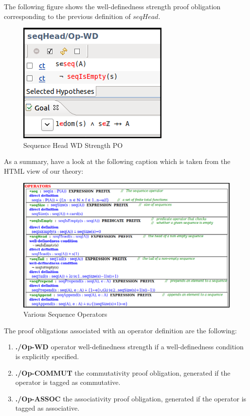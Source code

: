 The following figure shows the well-definedness strength proof obligation corresponding to the previous definition of $seqHead$.

\begin{center}
\begin{figure}
\label{seqOP}
\includegraphics{images/SeqHeadPO.png}
\caption{Sequence Head WD Strength PO}
\end{figure}
\end{center}

\par 
As a summary, have a look at the following caption which is taken from the HTML view of our theory:

\begin{center}
\begin{figure}
\label{seqOP}
\includegraphics{images/SeqOperators.png}
\caption{Various Sequence Operators}
\end{figure}
\end{center}

The proof obligations associated with an operator definition are the following:
\begin{enumerate}
	\item \textbf{./Op-WD} operator well-definedness strength if a well-definedness condition is explicitly specified.
	\item \textbf{./Op-COMMUT} the commutativity proof obligation, generated if the operator is tagged as commutative.
	\item \textbf{./Op-ASSOC} the associativity proof obligation, generated if the operator is tagged as associative.
\end{enumerate}

